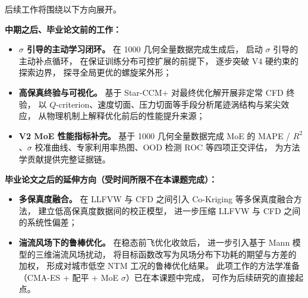 后续工作将围绕以下方向展开。

\textbf{中期之后、毕业论文前的工作：}
\begin{itemize}
  \item \textbf{$\sigma$ 引导的主动学习闭环。}
        在 1000 几何全量数据完成生成后，
        启动 $\sigma$ 引导的主动补点循环，
        在保证训练分布可控扩展的前提下，
        逐步突破 V4 硬约束的探索边界，
        探寻全局更优的螺旋桨外形；

  \item \textbf{高保真终验与可视化。}
        基于 Star-CCM+ 对最终优化解开展非定常 CFD 终验，
        以 $Q$-criterion、速度切面、压力切面等手段分析尾迹涡结构与桨尖效应，
        从物理机制上解释优化前后的性能提升来源；

  \item \textbf{V2 MoE 性能指标补完。}
        基于 1000 几何全量数据完成 MoE 的 MAPE / $R^2$、$\sigma$ 校准曲线、专家利用率热图、OOD 检测 ROC 等四项正交评估，
        为方法学贡献提供完整证据链。
\end{itemize}

\textbf{毕业论文之后的延伸方向（受时间所限不在本课题完成）：}
\begin{itemize}
  \item \textbf{多保真度融合。}
        在 LLFVW 与 CFD 之间引入 Co-Kriging 等多保真度融合方法，
        建立低高保真度数据间的校正模型，
        进一步压缩 LLFVW 与 CFD 之间的系统性偏差；

  \item \textbf{湍流风场下的鲁棒优化。}
        在稳态前飞优化收敛后，
        进一步引入基于 Mann 模型的三维湍流风场扰动，
        将目标函数改写为风场分布下功耗的期望与方差的加权，
        形成对城市低空 NTM 工况的鲁棒优化结果。
        此项工作的方法学准备（CMA-ES + 配平 + MoE $\sigma$）已在本课题中完成，
        可作为后续研究的直接起点。
\end{itemize}
